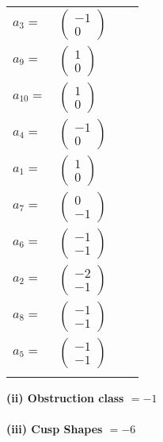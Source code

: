 \documentclass[1p]{elsarticle_modified}
\theoremstyle{definition}
\begin{document}
\begin{tabular}{m{7pt} m{180pt} m{7pt} m{180pt} }
\flushright $a_{3}=$&$\begin{pmatrix}-1\\0\end{pmatrix}$ \\
\flushright $a_{9}=$&$\begin{pmatrix}1\\0\end{pmatrix}$ \\
\flushright $a_{10}=$&$\begin{pmatrix}1\\0\end{pmatrix}$ \\
\flushright $a_{4}=$&$\begin{pmatrix}-1\\0\end{pmatrix}$ \\
\flushright $a_{1}=$&$\begin{pmatrix}1\\0\end{pmatrix}$ \\
\flushright $a_{7}=$&$\begin{pmatrix}0\\-1\end{pmatrix}$ \\
\flushright $a_{6}=$&$\begin{pmatrix}-1\\-1\end{pmatrix}$ \\
\flushright $a_{2}=$&$\begin{pmatrix}-2\\-1\end{pmatrix}$ \\
\flushright $a_{8}=$&$\begin{pmatrix}-1\\-1\end{pmatrix}$ \\
\flushright $a_{5}=$&$\begin{pmatrix}-1\\-1\end{pmatrix}$\\&\end{tabular}
\flushleft \textbf{(ii) Obstruction class $= -1$}\\~\\
\flushleft \textbf{(iii) Cusp Shapes $= -6$}\\~\\
\end{document}
